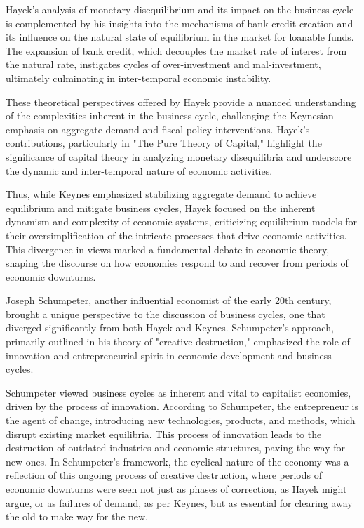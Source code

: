 \documentclass[12pt]{article}
\begin{document}
Hayek's analysis of monetary disequilibrium and its impact on the business cycle is complemented by his insights into
the mechanisms of bank credit creation and its influence on the natural state of equilibrium in the market for loanable
funds. The expansion of bank credit, which decouples the market rate of interest from the natural rate, instigates
cycles of over-investment and mal-investment, ultimately culminating in inter-temporal economic instability. 

These theoretical perspectives offered by Hayek provide a nuanced understanding of the complexities inherent in the
business cycle, challenging the Keynesian emphasis on aggregate demand and fiscal policy interventions. Hayek's
contributions, particularly in "The Pure Theory of Capital," highlight the significance of capital theory in analyzing
monetary disequilibria and underscore the dynamic and inter-temporal nature of economic activities. 

Thus, while Keynes emphasized stabilizing aggregate demand to achieve equilibrium and mitigate business cycles, Hayek
focused on the inherent dynamism and complexity of economic systems, criticizing equilibrium models for their
oversimplification of the intricate processes that drive economic activities. This divergence in views marked a
fundamental debate in economic theory, shaping the discourse on how economies respond to and recover from periods of
economic downturns. 
\par
\vspace{2cm}
Joseph Schumpeter, another influential economist of the early 20th century, brought a unique perspective to the
discussion of business cycles, one that diverged significantly from both Hayek and Keynes. Schumpeter's approach,
primarily outlined in his theory of "creative destruction," emphasized the role of innovation and entrepreneurial spirit
in economic development and business cycles.  

Schumpeter viewed business cycles as inherent and vital to capitalist economies, driven by the process of innovation.
According to Schumpeter, the entrepreneur is the agent of change, introducing new technologies, products, and methods,
which disrupt existing market equilibria. This process of innovation leads to the destruction of outdated industries and
economic structures, paving the way for new ones. In Schumpeter's framework, the cyclical nature of the economy was a
reflection of this ongoing process of creative destruction, where periods of economic downturns were seen not just as
phases of correction, as Hayek might argue, or as failures of demand, as per Keynes, but as essential for clearing away
the old to make way for the new. 
\end{document}
